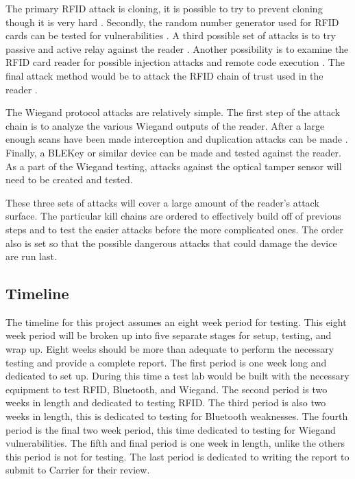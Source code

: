 \documentclass[10pt,twocolumn,letterpaper]{article}
\begin{document}
The primary RFID attack is cloning, it is possible to try to prevent cloning though it is very hard \cite{7888545} \cite{dijkPortableBumping} \cite{mitrokotsa09} \cite{7945583}.  Secondly, the random number generator used for RFID cards can be tested for vulnerabilities \cite{6565237} \cite{mitrokotsa09}. A third possible set of attacks is to try passive and active relay against the reader \cite{hancke2009confidence} \cite{6810722}.  Another possibility is to examine the RFID card reader for possible injection attacks and remote code execution \cite{garciaIClass}.  The final attack method would be to attack the RFID chain of trust used in the reader \cite{lehtonen07}.

The Wiegand protocol attacks are relatively simple.  The first step of the attack chain is to analyze the various Wiegand outputs of the reader.  After a large enough scans have been made interception and duplication attacks can be made \cite{chung2017wiegand}. Finally, a BLEKey \cite{baseggio2015BLEKey} or similar device can be made and tested against the reader.  As a part of the Wiegand testing, attacks against the optical tamper sensor will need to be created and tested.

These three sets of attacks will cover a large amount of the reader's attack surface.  The particular kill chains are ordered to effectively build off of previous steps and to test the easier attacks before the more complicated ones.  The order also is set so that the possible dangerous attacks that could damage the device are run last.

\subsection{Timeline}
The timeline for this project assumes an eight week period for testing.  This eight week period will be broken up into five separate stages for setup, testing, and wrap up.  Eight weeks should be more than adequate to perform the necessary testing and provide a complete report.  The first period is one week long and dedicated to set up.  During this time a test lab would be built with the necessary equipment to test RFID, Bluetooth, and Wiegand.  The second period is two weeks in length and dedicated to testing RFID.  The third period is also two weeks in length, this is dedicated to testing for Bluetooth weaknesses.  The fourth period is the final two week period, this time dedicated to testing for Wiegand vulnerabilities.  The fifth and final period is one week in length, unlike the others this period is not for testing.  The last period is dedicated to writing the report to submit to Carrier for their review.
\end{document}
